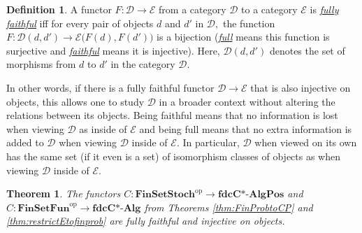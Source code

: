 \documentclass[12pt]{article}
\theoremstyle{theorem}
\newtheorem{theorem}[equation]{Theorem}
\theoremstyle{definition}
\newtheorem{definition}[equation]{Definition}
\numberwithin{equation}{section}
\newcommand{\bt}{\begin{theorem}}
\newcommand{\et}{\end{theorem}}
\newcommand{\bd}{\begin{definition}}
\newcommand{\ed}{\end{definition}}
\newcommand{\<}{\langle}
\renewcommand{\>}{\rangle}
\newcommand{\mD}{\mathcal{D}}
\newcommand{\fdcCAlg}{\mathbf{fdcC\text{*-}Alg}}
\newcommand{\fdcCAlgPos}{\mathbf{fdcC\text{*-}AlgPos}}
\newcommand{\FinSetFun}{\mathbf{FinSetFun}}
\newcommand{\FinSetStoch}{\mathbf{FinSetStoch}}
\newcommand{\op}{\mathrm{op}}
\begin{document}
\bd
\label{defn:fullyfaithful}
A functor $F:\mD\to\mathcal{E}$ from a category $\mD$ to a category $\mathcal{E}$
is \emph{\uline{fully faithful}} iff for every pair of objects $d$ and $d'$ in $\mD,$
the function $F:\mD(d,d')\to\mathcal{E}\big(F(d),F(d')\big)$ is a bijection
(\emph{\uline{full}} means this function is surjective and \emph{\uline{faithful}} 
means it is injective). Here, $\mD(d,d')$ denotes the set of morphisms
from $d$ to $d'$ in the category $\mD.$ 
\ed
In other words, if there is a fully faithful functor $\mD\to\mathcal{E}$ that
is also injective on objects, this allows one to study
$\mD$ in a broader context without altering the relations between its objects. 
Being faithful means that no information is lost when viewing 
$\mD$ as inside of $\mathcal{E}$ and being full means that no extra information is added to $\mD$ 
when viewing $\mD$ inside of $\mathcal{E}.$ In particular, $\mD$ when viewed on its own
has the same set (if it even is a set) of isomorphism classes of objects
as when viewing $\mD$ inside of $\mathcal{E}.$ 


\bt
\label{thm:fdfullyfaithful}
The functors $C:\FinSetStoch^{\op}\to\fdcCAlgPos$ and 
$C:\FinSetFun^{\op}\to\fdcCAlg$ 
from Theorems \ref{thm:FinProbtoCP} and \ref{thm:restrictEtofinprob}
are fully faithful and injective on objects.
\et
\end{document}

